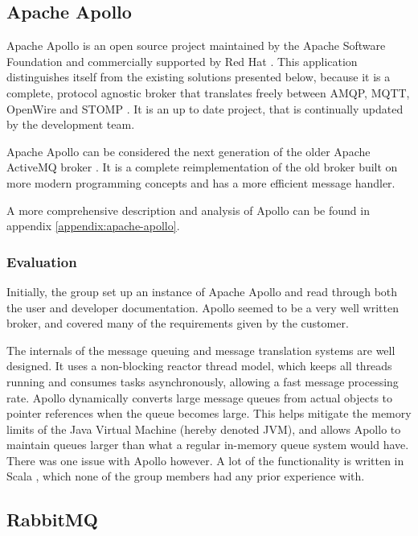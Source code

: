 \subsection{Apache Apollo}
\label{subsec:prestudies-existing_solutions-apache_apollo}

Apache Apollo \cite{apache-apollo} is an open source project maintained by the Apache Software Foundation \cite{apache} and commercially supported by Red Hat \cite{red-hat}. This application distinguishes itself from the existing solutions presented below, because it is a complete, protocol agnostic broker that translates freely between AMQP, MQTT, OpenWire \cite{openwire} and STOMP \cite{stomp}. It is an up to date project, that is continually updated by the development team.

Apache Apollo can be considered the next generation of the older Apache ActiveMQ broker \cite{activemq}. It is a complete reimplementation of the old broker built on more modern programming concepts and has a more efficient message handler.

A more comprehensive description and analysis of Apollo can be found in appendix \ref{appendix:apache-apollo}.

\subsubsection{Evaluation}
\label{subsec:prestudies-existing_solutions-apache_apollo-evaluation}

Initially, the group set up an instance of Apache Apollo and read through both the user and developer documentation. Apollo seemed to be a very well written broker, and covered many of the requirements given by the customer.

The internals of the message queuing and message translation systems are well designed. It uses a non-blocking reactor thread model, which keeps all threads running and consumes tasks asynchronously, allowing a fast message processing rate. Apollo dynamically converts large message queues from actual objects to pointer references when the queue becomes large. This helps mitigate the memory limits of the Java Virtual Machine (hereby denoted JVM), and allows Apollo to maintain queues larger than what a regular in-memory queue system would have. There was one issue with Apollo however. A lot of the functionality is written in Scala \cite{scala}, which none of the group members had any prior experience with.

\subsection{RabbitMQ}
\label{subsec:prestudies-existing_solutions-rabbitmq}

